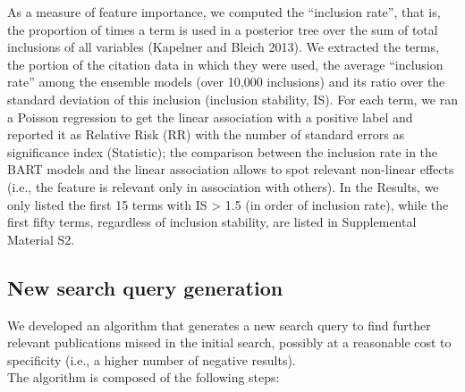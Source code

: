 \documentclass{article}
\begin{document}
As a measure of feature importance, we computed the ``inclusion rate'',
that is, the proportion of times a term is used in a posterior tree over
the sum of total inclusions of all variables (Kapelner and Bleich 2013).
We extracted the terms, the portion of the citation data in which they
were used, the average ``inclusion rate'' among the ensemble models
(over 10,000 inclusions) and its ratio over the standard deviation of
this inclusion (inclusion stability, IS). For each term, we ran a
Poisson regression to get the linear association with a positive label
and reported it as Relative Risk (RR) with the number of standard errors
as significance index (Statistic); the comparison between the inclusion
rate in the BART models and the linear association allows to spot
relevant non-linear effects (i.e., the feature is relevant only in
association with others). In the Results, we only listed the first 15
terms with IS \textgreater{} 1.5 (in order of inclusion rate), while the
first fifty terms, regardless of inclusion stability, are listed in
Supplemental Material S2.

\hypertarget{new-search-query-generation}{%
\subsection{New search query
generation}\label{new-search-query-generation}}

We developed an algorithm that generates a new search query to find
further relevant publications missed in the initial search, possibly at
a reasonable cost to specificity (i.e., a higher number of negative
results).\\
The algorithm is composed of the following steps:
\end{document}
